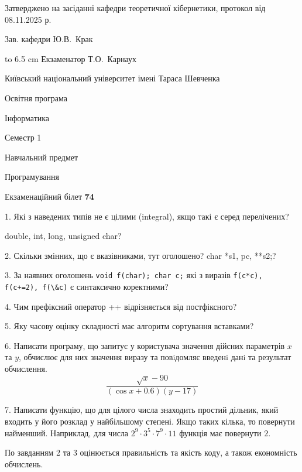 \documentclass[12pt, ukrainian]{article}
\def\code#1{\Verb!#1!}
\begin{document}
{\smallskip\smallskip \begin {scriptsize} Затверджено на засіданні кафедри теоретичної кібернетики, протокол   від   08.11.2025 р.\par\smallskip\smallskip\smallskip\smallskip
{\parbox {6.5 cm} {Зав. кафедри \dotfill Ю.В.~Крак}}\hspace {0.7cm} {\hbox to 6.5 cm { Екзаменатор \dotfill Т.О.~Карнаух}} \end{scriptsize}}
\vspace{0.9cm}
{{\begin {scriptsize}\par
{ \center  Київський національний університет імені Тараса Шевченка \par}
{\parbox {5 cm}{Освітня програма \hfill}{\parbox {7 cm}{Інформатика\hfill}}\parbox {6 cm}{\hfill Семестр 1}}\par
{\parbox {5 cm} {Навчальний предмет \hfill}\parbox {7 cm}{Програмування \hfill}\parbox {6cm}{\hfill}\par}\vspace{-15pt} \end{scriptsize}}{\center Екзаменаційний білет \No \textbf { 74 }\par}}
{%
1. Які з наведених типів не є цілими (integral), якщо такі є серед перелічених?

double, int, long, unsigned char?
\par
\vspace{2mm}
2. Скільки змінних, що є вказівниками, тут оголошено?
char *s1, pc, **s2;?
\par
\vspace{2mm}
3. За наявних оголошень \code{void f(char); char c;} які з виразів \code{f(c*c), f(c+=2), f(\&c)} є синтаксично коректними?
\par
\vspace{2mm}
4. Чим префіксний оператор ++ відрізняється від постфіксного?
\par
\vspace{2mm}
5. Яку часову оцінку складності має алгоритм сортування вставками?
\par
\vspace{2mm}
6. Написати програму, що запитує у користувача значення дійсних параметрів $x$ та $y$, обчислює для них значення виразу та повiдомляє введенi данi та результат обчислення.
$$\frac{\sqrt x - 90}{(\cos x + 0.6) (y - 17)}$$ 

\par
7. Написати функцію, що для цілого числа знаходить простий дільник, який входить у його розклад у найбільшому степені. Якщо таких кілька, то повернути найменший. Наприклад, для числа $2^{9}{\cdot}3^5{\cdot}7^9{\cdot}11$ функція має повернути $2$.

По завданням 2 та 3 оцінюється правильність та якість коду, а також економність обчислень.

}
\end{document}
